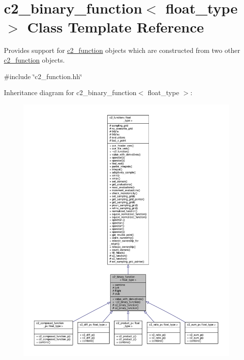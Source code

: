 \hypertarget{classc2__binary__function}{}\section{c2\+\_\+binary\+\_\+function$<$ float\+\_\+type $>$ Class Template Reference}
\label{classc2__binary__function}


Provides support for \hyperlink{classc2__function}{c2\+\_\+function} objects which are constructed from two other \hyperlink{classc2__function}{c2\+\_\+function} objects.  




{\ttfamily \#include \char`\"{}c2\+\_\+function.\+hh\char`\"{}}



Inheritance diagram for c2\+\_\+binary\+\_\+function$<$ float\+\_\+type $>$\+:
\nopagebreak
\begin{figure}[H]
\begin{center}
\leavevmode
\includegraphics[width=350pt]{classc2__binary__function__inherit__graph}
\end{center}
\end{figure}


